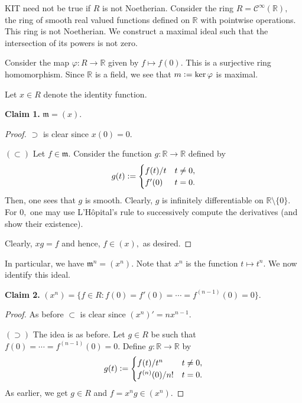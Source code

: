 \documentclass[12pt]{article}	%
\begin{document}
\begin{ex}
	KIT need not be true if $R$ is not Noetherian. Consider the ring $R = \mathcal{C}^\infty(\mathbb{R}),$ the ring of smooth real valued functions defined on $\mathbb{R}$ with pointwise operations. This ring is not Noetherian. We construct a maximal ideal such that the intersection of its powers is not zero.

	Consider the map $\varphi : R \to \mathbb{R}$ given by $f \mapsto f(0).$ This is a surjective ring homomorphism. Since $\mathbb{R}$ is a field, we see that $m \vcentcolon= \ker \varphi$ is maximal.

	Let $x \in R$ denote the identity function. 

	\textbf{Claim 1.} $\mathfrak{m} = (x).$
	\begin{proof} 
		$\supset$ is clear since $x(0) = 0.$

		$(\subset)$ Let $f \in \mathfrak{m}.$ Consider the function $g : \mathbb{R} \to \mathbb{R}$ defined by
		\begin{equation*} 
			g(t) \vcentcolon= \begin{cases}
				f(t)/t & t \neq 0,\\
				f'(0) & t = 0.
			\end{cases}
		\end{equation*}
		Then, one sees that $g$ is smooth. Clearly, $g$ is infinitely differentiable on $\mathbb{R} \setminus \{0\}.$ For $0,$ one may use L'H\^{o}pital's rule to successively compute the derivatives (and show their existence).

		Clearly, $xg = f$ and hence, $f \in (x),$ as desired.
	\end{proof}

	In particular, we have $\mathfrak{m}^n = (x^n).$ Note that $x^n$ is the function $t \mapsto t^n.$ We now identify this ideal.

	\textbf{Claim 2.} $(x^n) = \{f \in R : f(0) = f'(0) = \cdots = f^{(n - 1)}(0) = 0\}.$
	\begin{proof} 
		As before $\subset$ is clear since $(x^n)' = nx^{n - 1}.$

		$(\supset)$ The idea is as before. Let $g \in R$ be such that $f(0) = \cdots = f^{(n - 1)}(0) = 0.$ Define $g : \mathbb{R} \to \mathbb{R}$ by
		\begin{equation*} 
			g(t) \vcentcolon= \begin{cases}
				f(t)/t^n & t \neq 0,\\
				f^{(n)}(0)/n! & t = 0.
			\end{cases}
		\end{equation*}
		As earlier, we get $g \in R$ and $f = x^ng \in (x^n).$
	\end{proof}


\end{ex}
\end{document}
